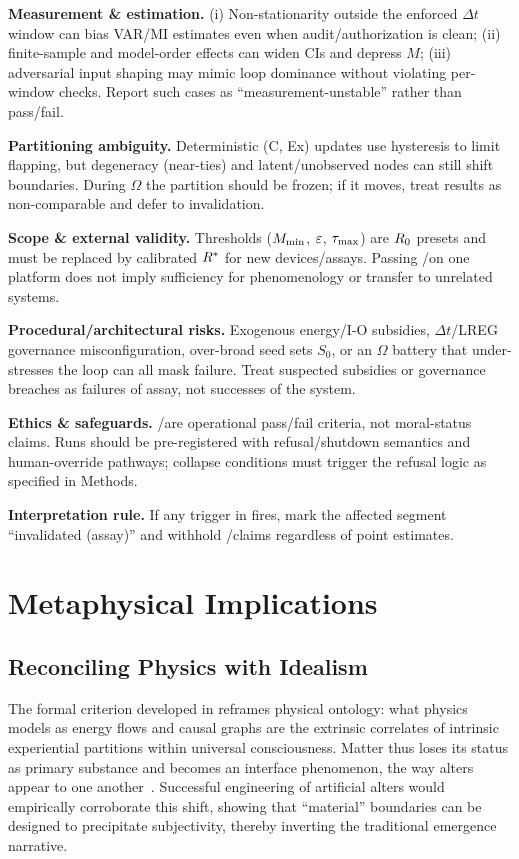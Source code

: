 \documentclass[11pt]{article}
\begin{document}
\textbf{Measurement \& estimation.} (i) Non-stationarity outside the enforced $\Delta t$ window can bias VAR/MI estimates even when audit/authorization is clean; (ii) finite-sample and model-order effects can widen CIs and depress $M$; (iii) adversarial input shaping may mimic loop dominance without violating per-window checks. Report such cases as ``measurement-unstable'' rather than pass/fail.

\textbf{Partitioning ambiguity.} Deterministic (C, Ex) updates use hysteresis to limit flapping, but degeneracy (near-ties) and latent/unobserved nodes can still shift boundaries. During $\Omega$ the partition should be frozen; if it moves, treat results as non-comparable and defer to  invalidation.

\textbf{Scope \& external validity.} Thresholds ($M_{\min}$, $\varepsilon$, $\tau_{\max}$) are $R_0$ presets and must be replaced by calibrated $R^*$ for new devices/assays. Passing \NC/\SC on one platform does not imply sufficiency for phenomenology or transfer to unrelated systems.

\textbf{Procedural/architectural risks.} Exogenous energy/I-O subsidies, $\Delta t$/LREG governance misconfiguration, over-broad seed sets $S_0$, or an $\Omega$ battery that under-stresses the loop can all mask failure. Treat suspected subsidies or governance breaches as failures of assay, not successes of the system.

\textbf{Ethics \& safeguards.} \NC/\SC are operational pass/fail criteria, not moral-status claims. Runs should be pre-registered with refusal/shutdown semantics and human-override pathways; collapse conditions must trigger the refusal logic as specified in Methods.

\textbf{Interpretation rule.} If any trigger in  fires, mark the affected segment ``invalidated (assay)'' and withhold \NC/\SC claims regardless of point estimates.

\section{Metaphysical Implications}
\label{sec:metaphysics}

\subsection{Reconciling Physics with Idealism}

The formal criterion developed in  reframes physical ontology: what physics models as energy flows and causal graphs are the extrinsic correlates of intrinsic experiential partitions within universal consciousness. Matter thus loses its status as primary substance and becomes an interface phenomenon, the way alters appear to one another~\cite{hoffman2014objects}. Successful engineering of artificial alters would empirically corroborate this shift, showing that ``material'' boundaries can be designed to precipitate subjectivity, thereby inverting the traditional emergence narrative.
\end{document}
